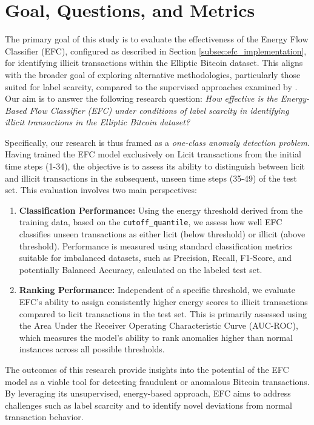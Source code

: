 \documentclass[12pt]{article}
\begin{document}
\section{Goal, Questions, and Metrics} \label{subsec:task}
The primary goal of this study is to evaluate the effectiveness of the Energy Flow Classifier (EFC), configured
as described in Section \ref{subsec:efc_implementation}, for identifying illicit transactions within the Elliptic
Bitcoin dataset. This aligns with the broader goal of exploring alternative methodologies, particularly those suited for
label scarcity, compared to the supervised approaches examined by \cite{lorenz2021machinelearningmethodsdetect}. Our aim
is to answer the following research question: \emph{How effective is the Energy-Based Flow Classifier (EFC) under conditions
of label scarcity in identifying illicit transactions in the Elliptic Bitcoin dataset?}

Specifically, our research is thus framed as a \emph{one-class anomaly detection problem}. Having trained the EFC model exclusively
on Licit transactions from the initial time steps (1-34), the objective is to assess its ability to distinguish between
licit and illicit transactions in the subsequent, unseen time steps (35-49) of the test set. This evaluation involves
two main perspectives:

\begin{enumerate}
    \item \textbf{Classification Performance:} Using the energy threshold derived from the training data, based on the
      \texttt{cutoff\_quantile}, we assess how well EFC classifies unseen transactions as either licit (below threshold)
      or illicit (above threshold). Performance is measured using standard classification metrics suitable for imbalanced
      datasets, such as Precision, Recall, F1-Score, and potentially Balanced Accuracy, calculated on the labeled test set.
      
    \item \textbf{Ranking Performance:} Independent of a specific threshold, we evaluate EFC's ability to assign consistently
      higher energy scores to illicit transactions compared to licit transactions in the test set. This is primarily
      assessed using the Area Under the Receiver Operating Characteristic Curve (AUC-ROC), which measures the model's
      ability to rank anomalies higher than normal instances across all possible thresholds.
\end{enumerate}

The outcomes of this research provide insights into the potential of the EFC model as a viable tool for detecting fraudulent or
anomalous Bitcoin transactions. By leveraging its unsupervised, energy-based approach, EFC aims to address challenges such
as label scarcity and to identify novel deviations from normal transaction behavior. 
\end{document}
